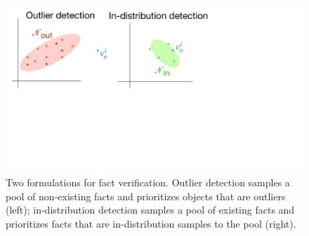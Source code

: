 
\begin{figure}
        \centering
      \includegraphics[width=0.9\columnwidth]{submissions/Ali2023/figures/outin.pdf}
      \caption{Two formulations for fact verification. Outlier detection samples a pool of non-existing facts and prioritizes objects that are outliers (left); in-distribution detection samples a pool of existing facts and prioritizes facts that are in-distribution samples to the pool (right).}
    \label{fig:met_out}
\end{figure}


